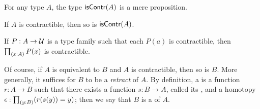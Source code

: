 \documentclass[hott-all.tex]{subfiles}
\begin{document}
\begin{lem}\label{thm:isprop-iscontr}
  For any type $A$, the type $\mathsf{isContr}(A)$ is a mere proposition.
\end{lem}

\begin{cor}\label{thm:contr-contr}
  If $A$ is contractible, then so is $\mathsf{isContr}(A)$.
\end{cor}


\begin{lem}\label{thm:contr-forall}
  If $P:A\to\mathcal{U}$ is a type family such that each $P(a)$ is contractible, then $\prd{x:A} P(x)$ is contractible.
\end{lem}
%

Of course, if $A$ is equivalent to $B$ and $A$ is contractible, then so is $B$.
More generally, it suffices for $B$ to be a \emph{retract} of $A$.
By definition, a 
is a function $r : A \to B$ such that there exists a function $s : B \to A$, called its ,
and a homotopy $\epsilon:\prd{y:B} (r(s(y))=y)$; then we say that $B$ is a %
of $A$.
\end{document}
